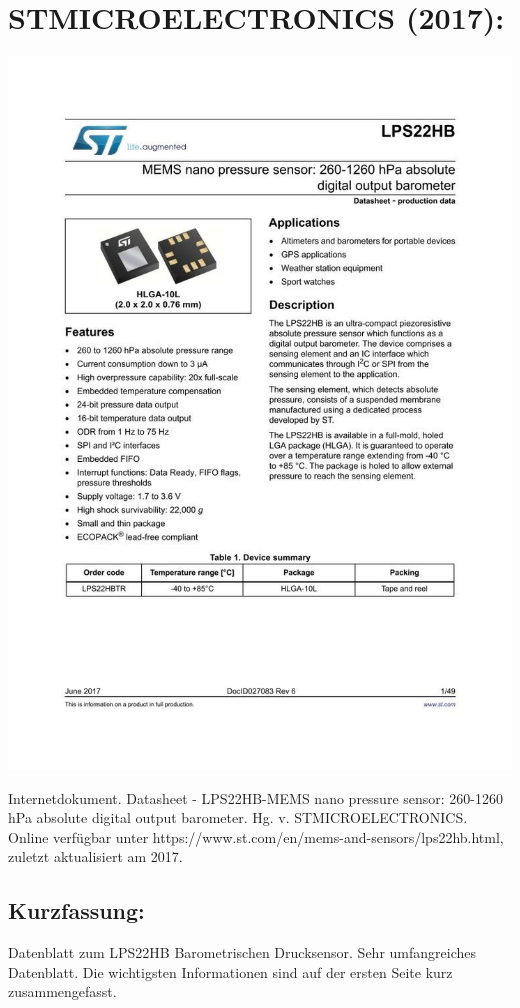 \section*{STMICROELECTRONICS (2017):}
\begin{minipage}{0.5\textwidth}
	\includegraphics[width=\linewidth]{../Appendix/Literaturverzeichnis/img/STM2.jpg}
\end{minipage}
\hfill
\begin{minipage}{0.48\textwidth}
Internetdokument. Datasheet - LPS22HB-MEMS nano pressure sensor: 260-1260 hPa absolute digital output barometer.
Hg. v. STMICROELECTRONICS. Online verfügbar unter https://www.st.com/en/mems-and-sensors/lps22hb.html, zuletzt aktualisiert am 2017.
\subsection*{Kurzfassung:}
Datenblatt zum LPS22HB Barometrischen Drucksensor. Sehr umfangreiches Datenblatt. Die wichtigsten Informationen sind auf der ersten Seite kurz zusammengefasst.
\end{minipage}
